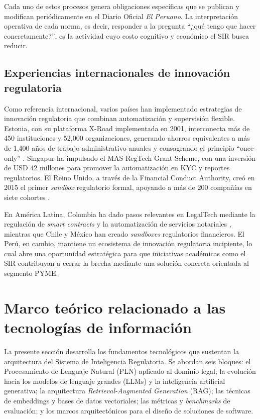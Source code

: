 \documentclass[12pt,a4paper,oneside]{report}
\begin{document}
Cada uno de estos procesos genera obligaciones específicas que se publican y modifican periódicamente en el Diario Oficial \textit{El Peruano}. La interpretación operativa de cada norma, es decir, responder a la pregunta \enquote{¿qué tengo que hacer concretamente?}, es la actividad cuyo costo cognitivo y económico el SIR busca reducir.

\subsection{Experiencias internacionales de innovación regulatoria}\label{subsec:experiencias-internacionales-innovacion-regulatoria}

Como referencia internacional, varios países han implementado estrategias de innovación regulatoria que combinan automatización y supervisión flexible. Estonia, con su plataforma X-Road implementada en 2001, interconecta más de 450 instituciones y 52,000 organizaciones, generando ahorros equivalentes a más de 1,400 años de trabajo administrativo anuales y consagrando el principio \enquote{once-only} \parencite{worldeconomicforum2017}. Singapur ha impulsado el MAS RegTech Grant Scheme, con una inversión de USD 42 millones para promover la automatización en KYC y reportes regulatorios. El Reino Unido, a través de la Financial Conduct Authority, creó en 2015 el primer \textit{sandbox} regulatorio formal, apoyando a más de 200 compañías en siete cohortes \parencite{charoenwong2024}.

En América Latina, Colombia ha dado pasos relevantes en LegalTech mediante la regulación de \textit{smart contracts} y la automatización de servicios notariales \parencite{rinconmartinez2022}, mientras que Chile y México han creado \textit{sandboxes} regulatorios financieros. El Perú, en cambio, mantiene un ecosistema de innovación regulatoria incipiente, lo cual abre una oportunidad estratégica para que iniciativas académicas como el SIR contribuyan a cerrar la brecha mediante una solución concreta orientada al segmento PYME.

\section{Marco teórico relacionado a las tecnologías de información}\label{sec:marco-teorico-tecnologias-informacion}

La presente sección desarrolla los fundamentos tecnológicos que sustentan la arquitectura del Sistema de Inteligencia Regulatoria. Se abordan seis bloques: el Procesamiento de Lenguaje Natural (PLN) aplicado al dominio legal; la evolución hacia los modelos de lenguaje grandes (LLMs) y la inteligencia artificial generativa; la arquitectura \textit{Retrieval-Augmented Generation} (RAG); las técnicas de embeddings y bases de datos vectoriales; las métricas y \textit{benchmarks} de evaluación; y los marcos arquitectónicos para el diseño de soluciones de software.
\end{document}
